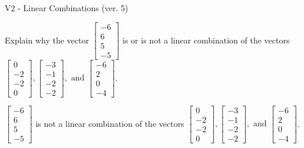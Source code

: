 \begin{exercise}
  \begin{exerciseTitle}V2 - Linear Combinations (ver. 5)\end{exerciseTitle}
  \begin{exerciseStatement}
    Explain why the vector \(\left[\begin{array}{c}
-6 \\
6 \\
5 \\
-5
\end{array}\right]\)  is or is not a linear 
	combination of the vectors \(\left[\begin{array}{c}
0 \\
-2 \\
-2 \\
0
\end{array}\right] , \left[\begin{array}{c}
-3 \\
-1 \\
-2 \\
-2
\end{array}\right] , \text{ and } \left[\begin{array}{c}
-6 \\
2 \\
0 \\
-4
\end{array}\right]\).
	


  \end{exerciseStatement}
  \begin{exerciseAnswer}
   \(\left[\begin{array}{c}
-6 \\
6 \\
5 \\
-5
\end{array}\right]\) 
  	 is not  
	a linear combination of the vectors \(\left[\begin{array}{c}
0 \\
-2 \\
-2 \\
0
\end{array}\right] , \left[\begin{array}{c}
-3 \\
-1 \\
-2 \\
-2
\end{array}\right] , \text{ and } \left[\begin{array}{c}
-6 \\
2 \\
0 \\
-4
\end{array}\right]\).

	
  


  \end{exerciseAnswer}
\end{exercise}